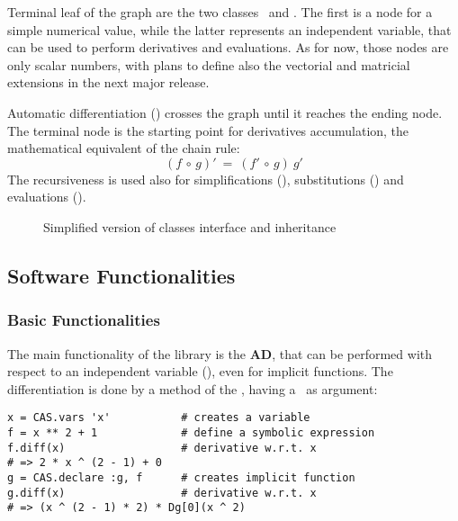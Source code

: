 Terminal leaf of the graph are the two classes \CASConstant~and \CASVariable. The first is a node for a simple numerical value, while the latter represents an independent variable, that can be used to perform derivatives and evaluations. As for now, those nodes are only scalar numbers, with plans to define also the vectorial and matricial extensions in the next major release.

Automatic differentiation (\CASOpdiff) crosses the graph until it reaches the ending node. The terminal node is the starting point for derivatives accumulation, the mathematical equivalent of the chain rule:
\begin{equation}
\left( f  \, \circ \, g \right)' \: = \:
\left( f' \, \circ \, g \right) \: g'
\end{equation}
The recursiveness is used also for simplifications (\CASOpsimplify), substitutions (\CASOpsubs) and evaluations (\CASOpcall).

\begin{figure}[ht!]
\label{fig:uml-container}
\centering

\caption{Simplified version of classes interface and inheritance}
\end{figure}

\subsection{Software Functionalities}
\label{sec:functionalities}

\subsubsection{Basic Functionalities}
The main functionality of the library is the \textbf{AD}, that can be performed with respect to an independent variable (\CASVariable), even for implicit functions. The differentiation is done by a method of the \CASOp, having a \CASVariable~as argument:
\begin{lstlisting}[caption={Differentiation example},label={code:example-diff}]
x = CAS.vars 'x'           # creates a variable
f = x ** 2 + 1             # define a symbolic expression
f.diff(x)                  # derivative w.r.t. x
# => 2 * x ^ (2 - 1) + 0
g = CAS.declare :g, f      # creates implicit function
g.diff(x)                  # derivative w.r.t. x
# => (x ^ (2 - 1) * 2) * Dg[0](x ^ 2)
\end{lstlisting}

